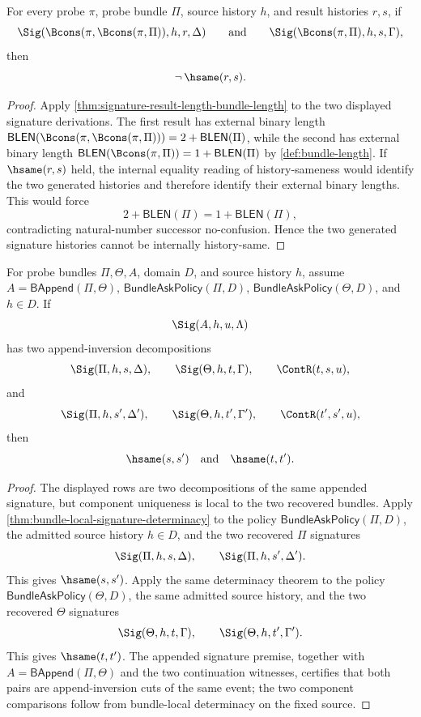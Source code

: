 \begin{theorem}
\label{thm:duplicate-probe-signature-contraction-obstruction}
For every probe $\pi$, probe bundle $\Pi$, source history $h$, and result
histories $r,s$, if
$$
\Sig(\Bcons(\pi,\Bcons(\pi,\Pi)),h,r,\Delta)
\qquad\text{and}\qquad
\Sig(\Bcons(\pi,\Pi),h,s,\Gamma),
$$
then
$$
\neg\,\hsame(r,s).
$$
\end{theorem}
\begin{proof}
Apply \autoref{thm:signature-result-length-bundle-length} to the two displayed
signature derivations. The first result has external binary length
$\mathsf{BLEN}(\Bcons(\pi,\Bcons(\pi,\Pi)))=2+\mathsf{BLEN}(\Pi)$, while the
second has external binary length
$\mathsf{BLEN}(\Bcons(\pi,\Pi))=1+\mathsf{BLEN}(\Pi)$ by
\autoref{def:bundle-length}. If $\hsame(r,s)$ held, the internal equality
reading of history-sameness would identify the two generated histories and
therefore identify their external binary lengths. This would force
$$
2+\mathsf{BLEN}(\Pi)=1+\mathsf{BLEN}(\Pi),
$$
contradicting natural-number successor no-confusion. Hence the two generated
signature histories cannot be internally history-same.
\end{proof}

\begin{theorem}
\label{thm:signature-append-cut-decomposition-uniqueness}
For probe bundles $\Pi,\Theta,A$, domain $D$, and source history $h$, assume
$A=\mathsf{BAppend}(\Pi,\Theta)$,
$\mathsf{BundleAskPolicy}(\Pi,D)$, $\mathsf{BundleAskPolicy}(\Theta,D)$, and
$h\in D$. If
$$
\Sig(A,h,u,\Lambda)
$$
has two append-inversion decompositions
$$
\Sig(\Pi,h,s,\Delta),
\qquad
\Sig(\Theta,h,t,\Gamma),
\qquad
\ContR(t,s,u),
$$
and
$$
\Sig(\Pi,h,s',\Delta'),
\qquad
\Sig(\Theta,h,t',\Gamma'),
\qquad
\ContR(t',s',u),
$$
then
$$
\hsame(s,s')
\quad\text{and}\quad
\hsame(t,t').
$$
\end{theorem}
\begin{proof}
The displayed rows are two decompositions of the same appended signature, but
component uniqueness is local to the two recovered bundles. Apply
\autoref{thm:bundle-local-signature-determinacy} to the policy
$\mathsf{BundleAskPolicy}(\Pi,D)$, the admitted source history $h\in D$, and
the two recovered $\Pi$ signatures
$$
\Sig(\Pi,h,s,\Delta),
\qquad
\Sig(\Pi,h,s',\Delta').
$$
This gives $\hsame(s,s')$. Apply the same determinacy theorem to the policy
$\mathsf{BundleAskPolicy}(\Theta,D)$, the same admitted source history, and the
two recovered $\Theta$ signatures
$$
\Sig(\Theta,h,t,\Gamma),
\qquad
\Sig(\Theta,h,t',\Gamma').
$$
This gives $\hsame(t,t')$. The appended signature premise, together with
$A=\mathsf{BAppend}(\Pi,\Theta)$ and the two continuation witnesses, certifies
that both pairs are append-inversion cuts of the same event; the two component
comparisons follow from bundle-local determinacy on the fixed source.
\end{proof}
